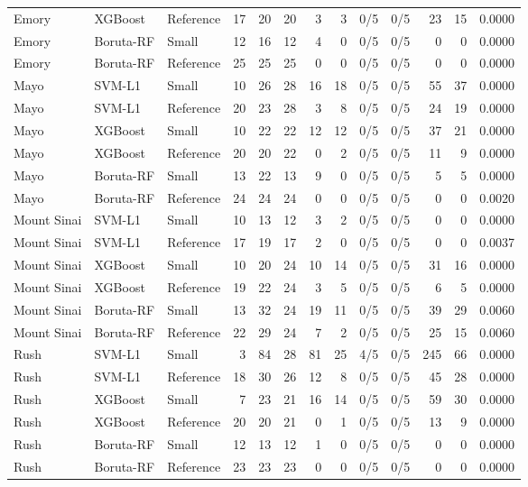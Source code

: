 \begin{table}[p]
{\begin{tabular}{lllrrrrrrrrrr}
Emory & XGBoost & Reference & 17 & 20 & 20 & 3 & 3 & 0/5 & 0/5 & 23 & 15 & 0.0000 \\
Emory & Boruta-RF & Small & 12 & 16 & 12 & 4 & 0 & 0/5 & 0/5 & 0 & 0 & 0.0000 \\
Emory & Boruta-RF & Reference & 25 & 25 & 25 & 0 & 0 & 0/5 & 0/5 & 0 & 0 & 0.0000 \\
\addlinespace[2pt]
Mayo & SVM-L1 & Small & 10 & 26 & 28 & 16 & 18 & 0/5 & 0/5 & 55 & 37 & 0.0000 \\
Mayo & SVM-L1 & Reference & 20 & 23 & 28 & 3 & 8 & 0/5 & 0/5 & 24 & 19 & 0.0000 \\
Mayo & XGBoost & Small & 10 & 22 & 22 & 12 & 12 & 0/5 & 0/5 & 37 & 21 & 0.0000 \\
Mayo & XGBoost & Reference & 20 & 20 & 22 & 0 & 2 & 0/5 & 0/5 & 11 & 9 & 0.0000 \\
Mayo & Boruta-RF & Small & 13 & 22 & 13 & 9 & 0 & 0/5 & 0/5 & 5 & 5 & 0.0000 \\
Mayo & Boruta-RF & Reference & 24 & 24 & 24 & 0 & 0 & 0/5 & 0/5 & 0 & 0 & 0.0020 \\
\addlinespace[2pt]
Mount Sinai & SVM-L1 & Small & 10 & 13 & 12 & 3 & 2 & 0/5 & 0/5 & 0 & 0 & 0.0000 \\
Mount Sinai & SVM-L1 & Reference & 17 & 19 & 17 & 2 & 0 & 0/5 & 0/5 & 0 & 0 & 0.0037 \\
Mount Sinai & XGBoost & Small & 10 & 20 & 24 & 10 & 14 & 0/5 & 0/5 & 31 & 16 & 0.0000 \\
Mount Sinai & XGBoost & Reference & 19 & 22 & 24 & 3 & 5 & 0/5 & 0/5 & 6 & 5 & 0.0000 \\
Mount Sinai & Boruta-RF & Small & 13 & 32 & 24 & 19 & 11 & 0/5 & 0/5 & 39 & 29 & 0.0060 \\
Mount Sinai & Boruta-RF & Reference & 22 & 29 & 24 & 7 & 2 & 0/5 & 0/5 & 25 & 15 & 0.0060 \\
\addlinespace[2pt]
Rush & SVM-L1 & Small & 3 & 84 & 28 & 81 & 25 & 4/5 & 0/5 & 245 & 66 & 0.0000 \\
Rush & SVM-L1 & Reference & 18 & 30 & 26 & 12 & 8 & 0/5 & 0/5 & 45 & 28 & 0.0000 \\
Rush & XGBoost & Small & 7 & 23 & 21 & 16 & 14 & 0/5 & 0/5 & 59 & 30 & 0.0000 \\
Rush & XGBoost & Reference & 20 & 20 & 21 & 0 & 1 & 0/5 & 0/5 & 13 & 9 & 0.0000 \\
Rush & Boruta-RF & Small & 12 & 13 & 12 & 1 & 0 & 0/5 & 0/5 & 0 & 0 & 0.0000 \\
Rush & Boruta-RF & Reference & 23 & 23 & 23 & 0 & 0 & 0/5 & 0/5 & 0 & 0 & 0.0000 \\
\bottomrule
\end{tabular}}
\end{table}

